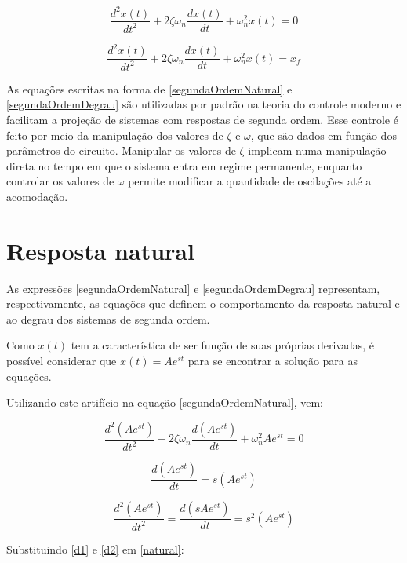 \documentclass[12pt,fleqn]{book} %
\begin{document}
{\begin{equation}\label{segundaOrdemNatural}
\frac{d^2x(t)}{dt^2} + 2\zeta\omega_n\frac{dx(t)}{dt} + \omega_n^2x(t) = 0 
\end{equation}

\begin{equation}\label{segundaOrdemDegrau}
\frac{d^2x(t)}{dt^2} + 2\zeta\omega_n\frac{dx(t)}{dt} + \omega_n^2x(t) = x_f
\end{equation}

As equações escritas na forma de \ref{segundaOrdemNatural} e \ref{segundaOrdemDegrau} são utilizadas por padrão na teoria do controle moderno e facilitam a projeção de sistemas com respostas de segunda ordem. Esse controle é feito por meio da manipulação dos valores de $\zeta$ e $\omega$, que são dados em função dos parâmetros do circuito. Manipular os valores de $\zeta$ implicam numa manipulação direta no tempo em que o sistema entra em regime permanente, enquanto controlar os valores de $\omega$ permite modificar a quantidade de oscilações até a acomodação.

\section{Resposta natural}\label{desenvolvimento}
As expressões \ref{segundaOrdemNatural} e \ref{segundaOrdemDegrau} representam, respectivamente, as equações que definem o comportamento da resposta natural e ao degrau dos sistemas de segunda ordem.

Como $x(t)$ tem a característica de ser função de suas próprias derivadas, é possível considerar que $x(t) = Ae^{st}$ para se encontrar a solução para as equações.

Utilizando este artifício na equação \ref{segundaOrdemNatural}, vem:

\begin{equation}\label{natural}
\frac{d^2(Ae^{st})}{dt^2} + 2\zeta\omega_n\frac{d(Ae^{st})}{dt} + \omega_n^2Ae^{st} = 0
\end{equation}

\begin{equation}\label{d1}
\frac{d(Ae^{st})}{dt} = s(Ae^{st})
\end{equation}

\begin{equation}\label{d2}
\frac{d^2(Ae^{st})}{dt^2} = \frac{d(sAe^{st})}{dt} = s^2(Ae^{st})
\end{equation}

Substituindo \ref{d1} e \ref{d2} em \ref{natural}:

}
\end{document}
